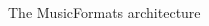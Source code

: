 \begin{adjustwidth}{0cm}{0cm}
\begin{figure}[ht]
\caption {The MusicFormats architecture}
\label{The MusicFormats architecture}
\begin{center}


\def \bendAngle {60}

\def \minimumRectangleHeight {10 mm}
\def \minimumRectangleWidth  {30 mm}

\def \separatorWidth {\minimumRectangleWidth}

\def \roundedCorners {10pt}


\begin{tikzpicture}[
	scale=0.42,
	>=open triangle 45,
	]



\end{tikzpicture}
\end{center}
\end{figure}
\end{adjustwidth}
